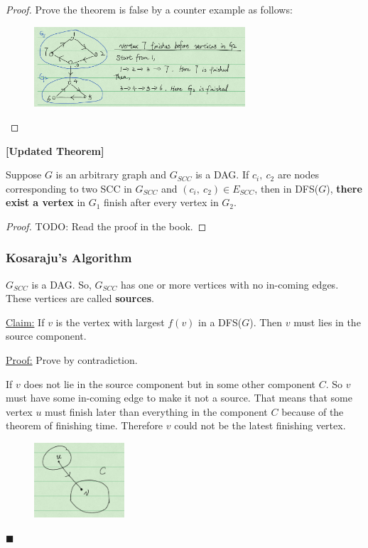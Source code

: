 \documentclass[en,hazy,blue,screen,14pt]{elegantnote}
\newenvironment{claim}[1]{\par\noindent\underline{Claim:}\space#1}{}
\newenvironment{claimproof}[1]{\par\noindent\underline{Proof:}\space#1}{\hfill $\blacksquare$}
\begin{document}
\begin{proof}
 Prove the theorem is false by a counter example as follows:
\begin{figure}[H]
\centering
\includegraphics[width=0.7\textwidth]{scc-finish-time.png}
\end{figure}
\end{proof}

\begin{theorem}\textbf{[Updated Theorem]}

Suppose $G$ is an arbitrary graph and $G_{SCC}$ is a DAG. If $c_i, ~c_2$ are 
nodes corresponding to two SCC in $G_{SCC}$ and $(c_i, ~c_2) \in E_{SCC}$, then 
in DFS($G$), \textbf{there exist a vertex} in $G_1$ finish after every vertex 
in $G_2$. 
\end{theorem}

\begin{proof}
 TODO: Read the proof in the book.
\end{proof}

\subsubsection{Kosaraju's Algorithm}
\begin{definition}
$G_{SCC}$ is a DAG. So, $G_{SCC}$ has one or more vertices with no in-coming 
edges. These vertices are called \textbf{sources}.
\end{definition}

\begin{claim}{}
If $v$ is the vertex with largest $f(v)$ in a DFS($G$). Then $v$ must lies in 
the source component. 
\end{claim}

\begin{claimproof}{}
Prove by contradiction.

If $v$ does not lie in the source component but in some other component $C$. So 
$v$ must have some in-coming edge to make it not a source. That means that 
some vertex $u$ must finish later than everything in the component $C$ because 
of the theorem of finishing time. Therefore $v$ could not be the latest 
finishing vertex.
\begin{figure}[H]
\centering
\includegraphics[width=0.3\textwidth]{source-finish-time.png}
\end{figure}
\end{claimproof}
\end{document}
